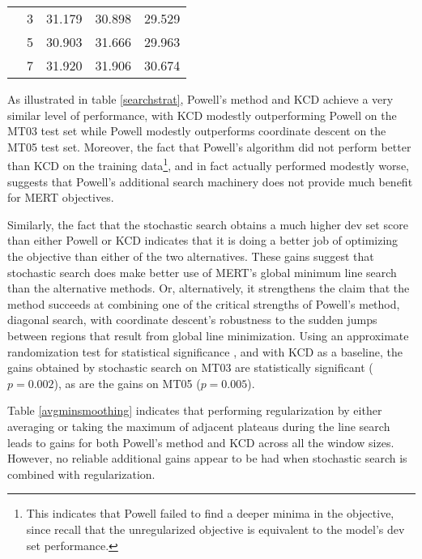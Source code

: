 \documentclass[11pt,tightenlines,kern-1pt]{article}
\begin{document}
\begin{table*}[htb!]
\begin{tabular}{|l|rrrr|}
           & 3  & 31.179 & 30.898 & 29.529 \\
           & 5  & 30.903 & 31.666 & 29.963 \\
           & 7  & 31.920 & 31.906 & 30.674 \\
\hline
\end{tabular}
\caption{
\label{avgminsmoothing}
BLEU scores obtained when regularizing using the average loss of adjacent plateaus, left, and the maximum loss of adjacent plateaus, right. The none entry for each search strategy represents the baseline where no regularization is used. Statistically significant test set gains, p \mbox{$<$} 0.01, over the respective baselines are in bold face. 
}
\end{table*}

As illustrated in table \ref{searchstrat}, Powell's method and KCD achieve a very similar level of performance, with KCD modestly outperforming Powell on the MT03 test set while Powell modestly outperforms coordinate descent on the MT05 test set. Moreover, the fact that Powell's algorithm did not perform better than KCD on the training data\footnote{This indicates that Powell failed to find a deeper minima in the objective, since recall that the unregularized objective is equivalent to the model's dev set performance.}, and in fact actually performed modestly worse, suggests that Powell's additional search machinery does not provide much benefit for MERT objectives. 

Similarly, the fact that the stochastic search obtains a much higher dev set score than either Powell or KCD indicates that it is doing a better job of optimizing the objective than either of the two alternatives. These gains suggest that stochastic search does make better use of MERT's global minimum line search than the alternative methods. Or, alternatively, it strengthens the claim that the method succeeds at combining one of the critical strengths of Powell's method, diagonal search, with coordinate descent's robustness to the sudden jumps between regions that result from global line minimization. Using an approximate randomization test for statistical significance \cite{fk2005}, and with KCD as a baseline, the gains obtained by stochastic search on MT03 are statistically significant (\mbox{$p = 0.002$}), as are the gains on MT05 (\mbox{$p=0.005$}). 

Table \ref{avgminsmoothing} indicates that performing regularization by either averaging or taking the maximum of adjacent plateaus during the line search leads to gains for both Powell's method and KCD across all the window sizes. However, no reliable additional gains appear to be had when stochastic search is combined with regularization.
\end{document}
